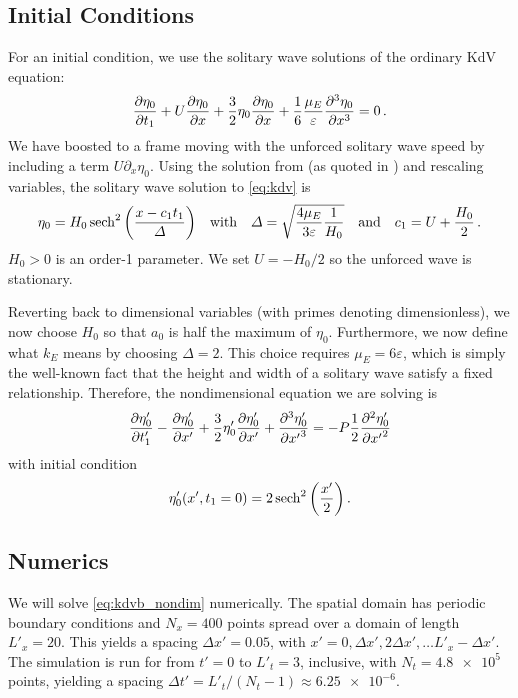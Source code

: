 \documentclass{jfm}
\renewcommand*{\epsilon}{\varepsilon}
\begin{document}
\subsection{Initial Conditions}
For an initial condition, we use the solitary wave solutions of
the ordinary KdV equation:
\begin{equation}
  \pdv{\eta_0}{t_1} + U\pdv{\eta_0}{x} + \frac{3}{2}
    \eta_0 \pdv{\eta_0}{x} + \frac{1}{6} \frac{\mu_E}{\epsilon}
    \pdv[3]{\eta_0}{x} = 0 \,.
  \label{eq:kdv}
\end{equation}
We have boosted to a frame moving with the unforced solitary wave speed
by including a term $U\partial_x \eta_0$.
Using the solution from \citet{dingemans1997water} (as quoted in
\citealp{brun2018convective}) and rescaling variables, the solitary
wave solution to \cref{eq:kdv} is
\begin{equation}
  \eta_0 = H_0 \sech^2\pqty{\frac{x - c_1 t_1}{\Delta}}
  \qq{with}
  \Delta = \sqrt{\frac{4 \mu_E}{3\epsilon} \frac{1}{H_0}}
  \qq{and}
  c_1 = U + \frac{H_0}{2} \,.
\end{equation}
$H_0>0$ is an order-1 parameter.
We set $U=-H_0/2$ so the unforced wave is stationary.

Reverting back to dimensional variables (with primes denoting
dimensionless), we now choose $H_0$ so that $a_0$ is half the maximum of
$\eta_0$.
Furthermore, we now define what $k_E$ means by choosing $\Delta = 2$.
This choice requires $\mu_E = 6 \epsilon$, which is simply the
well-known fact that the height and width of a solitary wave satisfy a
fixed relationship.
Therefore, the nondimensional equation we are solving is
\begin{equation}
  \pdv{\eta'_0}{t'_1} - \pdv{\eta'_0}{x'} + \frac{3}{2}
  \eta'_0 \pdv{\eta'_0}{x'} + \pdv[3]{\eta'_0}{{x'}} =
  -P \frac{1}{2} \pdv[2]{\eta'_0}{{x'}}
  \label{eq:kdvb_nondim}
\end{equation}
with initial condition
\begin{equation}
  \eta'_0(x',t_1=0) = 2 \sech^2\pqty{\frac{x'}{2}} \,.
  \label{eq:initial_condition}
\end{equation}

\subsection{Numerics}
We will solve \cref{eq:kdvb_nondim} numerically.
The spatial domain has periodic boundary conditions and $N_x = 400$
points spread over a domain of length $L'_x = 20$.
This yields a spacing $\Delta x' = 0.05$, with $x' = 0, \Delta x',
2\Delta x', \ldots L'_x - \Delta x'$.
The simulation is run for from $t'= 0$ to $L'_t = 3$, inclusive, with
$N_t = \num{4.8e5}$ points, yielding a spacing $\Delta t' = L'_t/(N_t-1)
\approx \num{6.25e-6}$.
\end{document}
